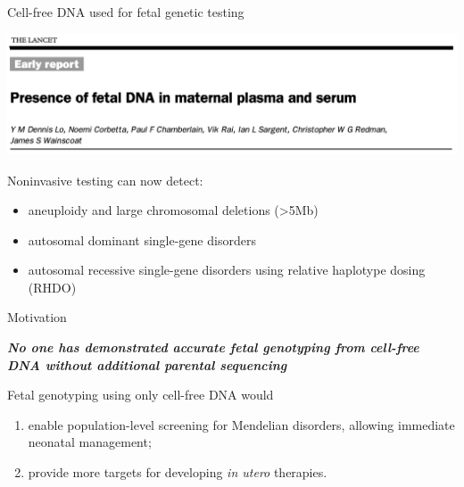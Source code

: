 \documentclass[
  10pt,
  ignorenonframetext,
  m]{beamer}
\begin{document}
\begin{frame}{Cell-free DNA used for fetal genetic testing}
\protect\hypertarget{cell-free-dna-used-for-fetal-genetic-testing}{}

\centering \includegraphics{images/lo.png}

\raggedright

\begin{block}{Noninvasive testing can now detect:}

\begin{itemize}
\item
  aneuploidy and large chromosomal deletions (\textgreater5Mb)
\item
  autosomal dominant single-gene disorders
\item
  autosomal recessive single-gene disorders using relative haplotype
  dosing (RHDO)
\end{itemize}

\end{block}

\end{frame}

\begin{frame}{Motivation}
\protect\hypertarget{motivation-2}{}

\centering

\textbf{\emph{No one has demonstrated accurate fetal genotyping from
cell-free DNA without additional parental sequencing}}

\bigskip\bigskip\raggedright

Fetal genotyping using only cell-free DNA would

\begin{enumerate}
\item
  enable population-level screening for Mendelian disorders, allowing
  immediate neonatal management;
\item
  provide more targets for developing \emph{in utero} therapies.
\end{enumerate}

\end{frame}
\end{document}
